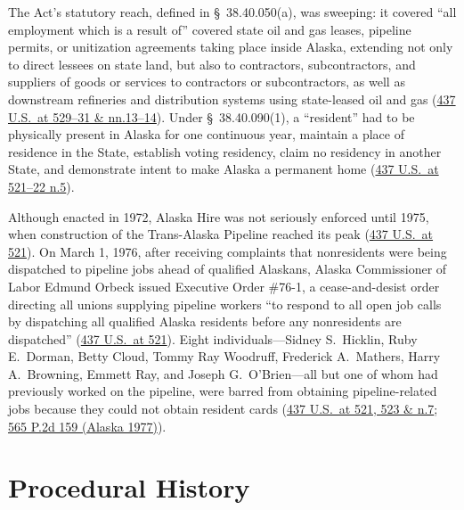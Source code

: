 \documentclass[12pt]{article}
\begin{document}
The Act's statutory reach, defined in \S\ 38.40.050(a), was sweeping: it covered ``all employment which is a result of'' covered state oil and gas leases, pipeline permits, or unitization agreements taking place inside Alaska, extending not only to direct lessees on state land, but also to contractors, subcontractors, and suppliers of goods or services to contractors or subcontractors, as well as downstream refineries and distribution systems using state-leased oil and gas (\href{https://supreme.justia.com/cases/federal/us/437/518/}{437 U.S.\ at 529--31 \& nn.13--14}). Under \S\ 38.40.090(1), a ``resident'' had to be physically present in Alaska for one continuous year, maintain a place of residence in the State, establish voting residency, claim no residency in another State, and demonstrate intent to make Alaska a permanent home (\href{https://supreme.justia.com/cases/federal/us/437/518/}{437 U.S.\ at 521--22 n.5}).

Although enacted in 1972, Alaska Hire was not seriously enforced until 1975, when construction of the Trans-Alaska Pipeline reached its peak (\href{https://supreme.justia.com/cases/federal/us/437/518/}{437 U.S.\ at 521}). On March 1, 1976, after receiving complaints that nonresidents were being dispatched to pipeline jobs ahead of qualified Alaskans, Alaska Commissioner of Labor Edmund Orbeck issued Executive Order \#76-1, a cease-and-desist order directing all unions supplying pipeline workers ``to respond to all open job calls by dispatching all qualified Alaska residents before any nonresidents are dispatched'' (\href{https://supreme.justia.com/cases/federal/us/437/518/}{437 U.S.\ at 521}). Eight individuals---Sidney S.\ Hicklin, Ruby E.\ Dorman, Betty Cloud, Tommy Ray Woodruff, Frederick A.\ Mathers, Harry A.\ Browning, Emmett Ray, and Joseph G.\ O'Brien---all but one of whom had previously worked on the pipeline, were barred from obtaining pipeline-related jobs because they could not obtain resident cards (\href{https://supreme.justia.com/cases/federal/us/437/518/}{437 U.S.\ at 521, 523 \& n.7}; \href{https://law.justia.com/cases/alaska/supreme-court/1977/3025-1.html}{565 P.2d 159 (Alaska 1977)}).

\section{Procedural History}
\end{document}
